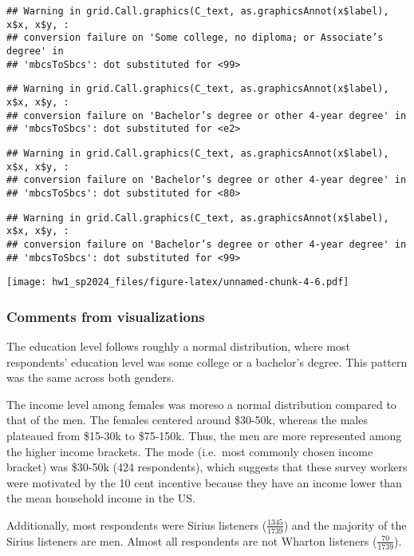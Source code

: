 \documentclass[
]{article}
\begin{document}
\begin{verbatim}
## Warning in grid.Call.graphics(C_text, as.graphicsAnnot(x$label), x$x, x$y, :
## conversion failure on 'Some college, no diploma; or Associate’s degree' in
## 'mbcsToSbcs': dot substituted for <99>
\end{verbatim}

\begin{verbatim}
## Warning in grid.Call.graphics(C_text, as.graphicsAnnot(x$label), x$x, x$y, :
## conversion failure on 'Bachelor’s degree or other 4-year degree' in
## 'mbcsToSbcs': dot substituted for <e2>
\end{verbatim}

\begin{verbatim}
## Warning in grid.Call.graphics(C_text, as.graphicsAnnot(x$label), x$x, x$y, :
## conversion failure on 'Bachelor’s degree or other 4-year degree' in
## 'mbcsToSbcs': dot substituted for <80>
\end{verbatim}

\begin{verbatim}
## Warning in grid.Call.graphics(C_text, as.graphicsAnnot(x$label), x$x, x$y, :
## conversion failure on 'Bachelor’s degree or other 4-year degree' in
## 'mbcsToSbcs': dot substituted for <99>
\end{verbatim}

\texttt{[image: hw1\_sp2024\_files/figure-latex/unnamed-chunk-4-6.pdf]}

\hypertarget{comments-from-visualizations}{%
\subsubsection{Comments from
visualizations}\label{comments-from-visualizations}}

The education level follows roughly a normal distribution, where most
respondents' education level was some college or a bachelor's degree.
This pattern was the same across both genders.

The income level among females was moreso a normal distribution compared
to that of the men. The females centered around \$30-50k, whereas the
males plateaued from \$15-30k to \$75-150k. Thus, the men are more
represented among the higher income brackets. The mode (i.e.~most
commonly chosen income bracket) was \$30-50k (424 respondents), which
suggests that these survey workers were motivated by the 10 cent
incentive because they have an income lower than the mean household
income in the US.

Additionally, most respondents were Sirius listeners
(\(\frac{1345}{1739}\)) and the majority of the Sirius listeners are
men. Almost all respondents are not Wharton listeners
(\(\frac{70}{1739}\)).
\end{document}

